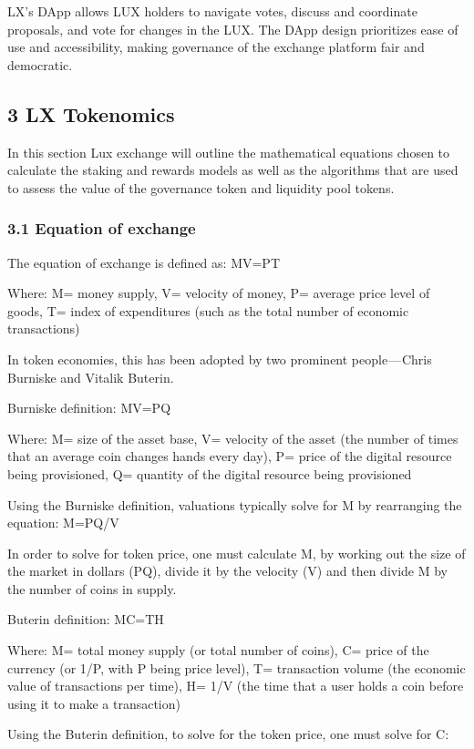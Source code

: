 \documentclass[11pt]{article}
\begin{document}
LX's DApp allows LUX holders to navigate votes, discuss and coordinate proposals, and vote for changes in the LUX. The DApp design prioritizes ease of use and accessibility, making governance of the exchange platform fair and democratic.


\subsection{3 LX Tokenomics}

In this section Lux exchange will outline the mathematical equations chosen to calculate the staking and rewards models as well as the algorithms that are used to assess the value of the governance token and liquidity pool tokens.


\subsubsection{3.1 Equation of exchange}

The equation of exchange is defined as: MV=PT


Where: M= money supply, V= velocity of money, P= average price level of goods, T= index of expenditures (such as the total number of economic transactions)


In token economies, this has been adopted by two prominent people --- Chris Burniske and Vitalik Buterin.


Burniske definition: MV=PQ


Where: M= size of the asset base, V= velocity of the asset (the number of times that an average coin changes hands every day), P= price of the digital resource being provisioned, Q= quantity of the digital resource being provisioned


Using the Burniske definition, valuations typically solve for M by rearranging the equation: M=PQ/V


In order to solve for token price, one must calculate M, by working out the size of the market in dollars (PQ), divide it by the velocity (V) and then divide M by the number of coins in supply.


Buterin definition: MC=TH


Where: M= total money supply (or total number of coins), C= price of the currency (or 1/P, with P being price level), T= transaction volume (the economic value of transactions per time), H= 1/V (the time that a user holds a coin before using it to make a transaction)


Using the Buterin definition, to solve for the token price, one must solve for C:
\end{document}
